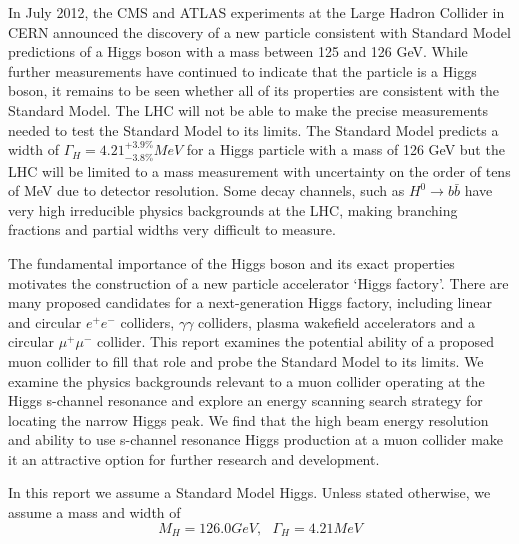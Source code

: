 \documentclass[a4paper]{article}
\begin{document}
In July 2012, the CMS and ATLAS experiments at the Large Hadron Collider in CERN announced the discovery of a new particle consistent with Standard Model predictions of a Higgs boson with a mass between 125 and 126 GeV. While further measurements have continued to indicate that the particle is a Higgs boson, it remains to be seen whether all of its properties are consistent with the Standard Model.\cite{cern-press} The LHC will not be able to make the precise measurements needed to test the Standard Model to its limits.\cite{lhc-higgs-width} The Standard Model predicts a width of $\Gamma_H = 4.21_{-3.8\%}^{+3.9\%} MeV$ for a Higgs particle with a mass of 126 GeV but the LHC will be limited to a mass measurement with uncertainty on the order of tens of MeV due to detector resolution.\cite{higgs-handbook}\cite{lhc-higgs-width} Some decay channels, such as $H^0\rightarrow b\bar{b}$ have very high irreducible physics backgrounds at the LHC, making branching fractions and partial widths very difficult to measure.\cite{H-meas-muller}\cite{lhc-higgs-width} 
	
	The fundamental importance of the Higgs boson and its exact properties motivates the construction of a new particle accelerator `Higgs factory'. There are many proposed candidates for a next-generation Higgs factory, including linear and circular $e^+e^-$ colliders, $\gamma\gamma$ colliders, plasma wakefield accelerators and a circular $\mu^+\mu^-$ collider.\cite{HF-tech-opt-delahaye} This report examines the potential ability of a proposed muon collider to fill that role and probe the Standard Model to its limits. We examine the physics backgrounds relevant to a muon collider operating at the Higgs s-channel resonance and explore an energy scanning search strategy for locating the narrow Higgs peak. We find that the high beam energy resolution and ability to use s-channel resonance Higgs production at a muon collider make it an attractive option for further research and development.

	In this report we assume a Standard Model Higgs. Unless stated otherwise, we assume a mass and width of 
\begin{equation}
	M_H = 126.0 GeV,\ \ \ \Gamma_H=4.21MeV \label{eq:higgs-props}
\end{equation}
\end{document}
